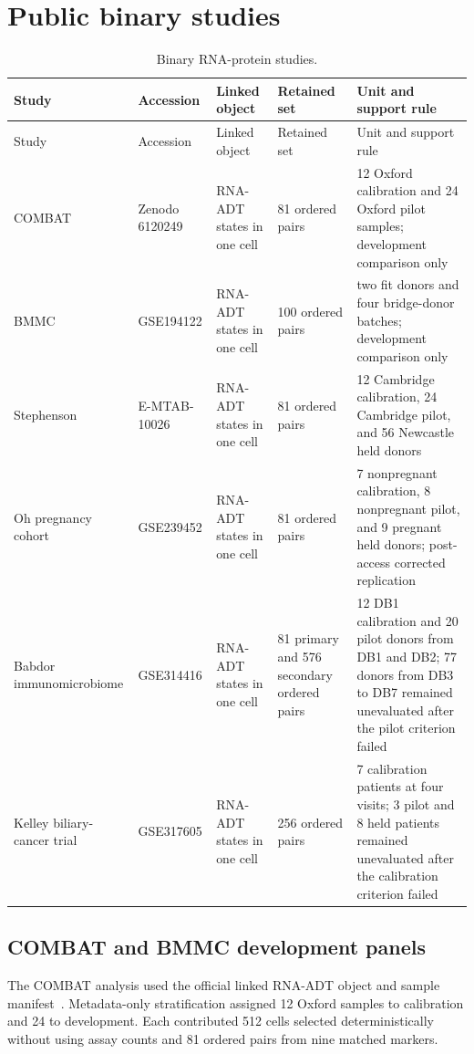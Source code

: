 \documentclass[10pt,a4paper]{article}
\begin{document}
\section{Public binary studies}

\begin{longtable}{@{}P{2.7cm}P{2.4cm}P{3.1cm}P{2.0cm}P{5.0cm}@{}}
\caption{Binary RNA-protein studies.}\label{tab:s-data}\\
\toprule
Study & Accession & Linked object & Retained set & Unit and support rule \\
\midrule
\endfirsthead
\toprule
Study & Accession & Linked object & Retained set & Unit and support rule \\
\midrule
\endhead
COMBAT & Zenodo 6120249 & RNA-ADT states in one cell & 81 ordered pairs & 12 Oxford calibration and 24 Oxford pilot samples; development comparison only \\
BMMC & GSE194122 & RNA-ADT states in one cell & 100 ordered pairs & two fit donors and four bridge-donor batches; development comparison only \\
Stephenson & E-MTAB-10026 & RNA-ADT states in one cell & 81 ordered pairs & 12 Cambridge calibration, 24 Cambridge pilot, and 56 Newcastle held donors \\
Oh pregnancy cohort & GSE239452 & RNA-ADT states in one cell & 81 ordered pairs & 7 nonpregnant calibration, 8 nonpregnant pilot, and 9 pregnant held donors; post-access corrected replication \\
Babdor immunomicrobiome & GSE314416 & RNA-ADT states in one cell & 81 primary and 576 secondary ordered pairs & 12 DB1 calibration and 20 pilot donors from DB1 and DB2; 77 donors from DB3 to DB7 remained unevaluated after the pilot criterion failed \\
Kelley biliary-cancer trial & GSE317605 & RNA-ADT states in one cell & 256 ordered pairs & 7 calibration patients at four visits; 3 pilot and 8 held patients remained unevaluated after the calibration criterion failed \\
\bottomrule
\end{longtable}

\subsection{COMBAT and BMMC development panels}

The COMBAT analysis used the official linked RNA-ADT object and sample manifest~\cite{combat2022}. Metadata-only stratification assigned 12 Oxford samples to calibration and 24 to development. Each contributed 512 cells selected deterministically without using assay counts and 81 ordered pairs from nine matched markers.
\end{document}
